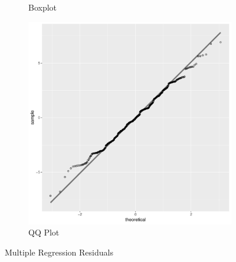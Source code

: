\documentclass[11pt,openany]{book}
\begin{document}
\begin{figure}
\begin{subfigure}[b]{0.4\textwidth}
                \caption{Boxplot \label{fig:multresidbox}}
        \end{subfigure}
        \begin{subfigure}[b]{0.4\textwidth}
                \centering
                \includegraphics[width=\textwidth]{../15_Diagnostics/multresidqq.pdf} %
                \caption{QQ Plot \label{fig:multresidqq}}
        \end{subfigure}
        \caption{Multiple Regression Residuals}
\end{figure}
\end{document}
